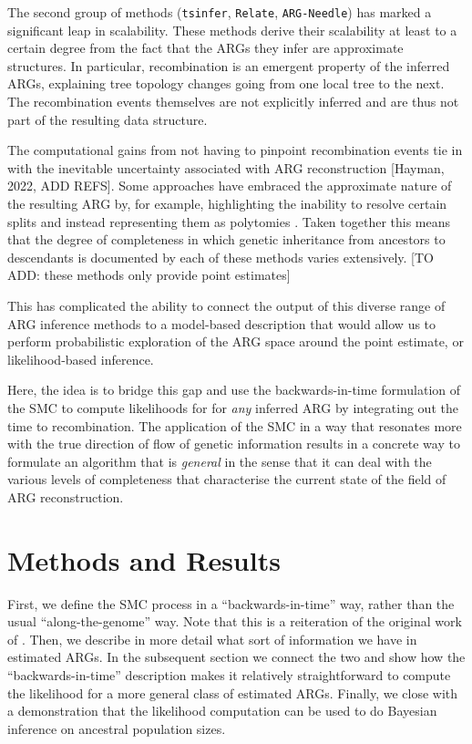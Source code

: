 \documentclass{article}
\newcommand{\tsinfer}[0]{\texttt{tsinfer}}
\newcommand{\argneedle}[0]{\texttt{ARG-Needle}}
\newcommand{\relate}[0]{\texttt{Relate}}
\begin{document}

The second group of methods (\tsinfer, \relate, \argneedle) has marked a significant
leap in scalability. These methods derive their scalability at least to a certain
degree from the fact that the ARGs they infer are approximate structures. In particular,
recombination is an emergent property of the inferred ARGs, explaining tree topology
changes going from one local tree to the next. The recombination events themselves
are not explicitly inferred and are thus not part of the resulting data structure.

The computational gains from not having to pinpoint recombination events tie in
with the inevitable uncertainty associated with ARG reconstruction [Hayman, 2022, ADD REFS].
Some approaches have embraced the approximate nature of the resulting ARG by, for
example, highlighting the inability to resolve certain splits and instead representing
them as polytomies \citep{kelleher_inferring_2019}. Taken together this means that the
degree of completeness in which genetic inheritance from ancestors to descendants is documented
by each of these methods varies extensively.
[TO ADD: these methods only provide point estimates]


This has complicated the ability to connect the output of this diverse range of
ARG inference methods to a model-based description that would allow us to perform
probabilistic exploration of the ARG space around the point estimate,
or likelihood-based inference.

Here, the idea is to bridge this gap and use the backwards-in-time formulation of the SMC
to compute likelihoods for for \textit{any} inferred ARG
by integrating out the time to recombination.
The application of the SMC in a way that resonates more
with the true direction of flow of genetic information
results in a concrete way to formulate an algorithm
that is \textit{general} in the sense that it can deal with the various levels of
completeness that characterise the current state of the field of ARG reconstruction.


\section{Methods and Results}

First, we define the SMC process in a ``backwards-in-time'' way,
rather than the usual ``along-the-genome'' way.
Note that this is a
reiteration of the original work of \citet{mcvean_approximating_2005}.
Then, we describe
in more detail what sort of information we have in estimated ARGs.
In the subsequent section we connect the two and
show how the ``backwards-in-time'' description
makes it relatively straightforward to compute the likelihood
for a more general class of estimated ARGs.
Finally, we close with a demonstration that the likelihood computation can be used
to do Bayesian inference on ancestral population sizes.
\end{document}

